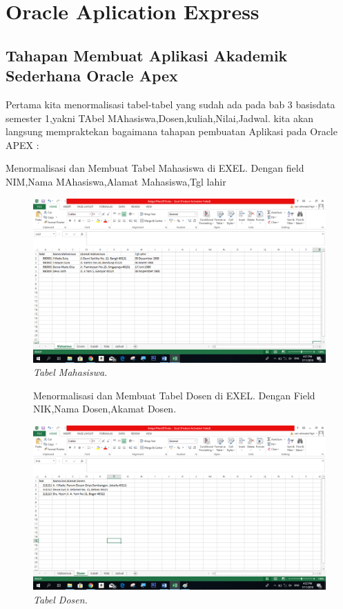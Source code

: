 \chapter{Oracle Aplication Express}

\section{Tahapan Membuat Aplikasi Akademik Sederhana Oracle Apex}
Pertama kita menormalisasi tabel-tabel yang sudah ada pada bab 3 basisdata semester 1,yakni TAbel MAhasiswa,Dosen,kuliah,Nilai,Jadwal. kita akan langsung mempraktekan bagaimana tahapan pembuatan Aplikasi pada Oracle APEX :

\begin{enumerate}
\item[1]Menormalisasi dan Membuat Tabel Mahasiswa di EXEL. Dengan field NIM,Nama MAhasiswa,Alamat Mahasiswa,Tgl lahir

\begin{figure}[!htbp]
    \begin{center}
    \includegraphics[scale=0.4]{figures/1.png}
    \caption{\textit{Tabel Mahasiswa.}}
    \end{center}   
    \end{figure}

\begin{figure}
\item[2]Menormalisasi dan Membuat Tabel Dosen di EXEL. Dengan Field NIK,Nama Dosen,Akamat Dosen.

    \begin{center}
    \includegraphics[scale=0.4]{figures/2.png}
    \caption{\textit{Tabel Dosen.}}
    \end{center}
    \label{gambar}
    \end{figure}


\end{enumerate}
